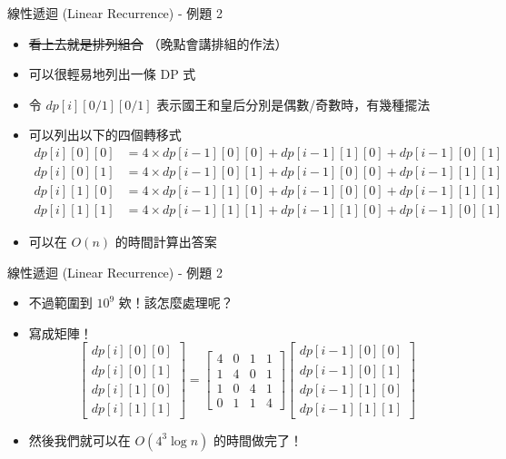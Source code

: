 \documentclass[aspectratio=169]{beamer}
\begin{document}
    \begin{frame}[fragile]{線性遞迴 (Linear Recurrence) - 例題 2}
        \begin{itemize}
            \item \sout{看上去就是排列組合} （晚點會講排組的作法）
            \item 可以很輕易地列出一條 DP 式
            \item 令 $dp[i][0/1][0/1]$ 表示國王和皇后分別是偶數/奇數時，有幾種擺法
            \item<2-> 可以列出以下的四個轉移式
            \begin{align*}
                dp[i][0][0] &= 4 \times dp[i-1][0][0] + dp[i-1][1][0] + dp[i-1][0][1] \\
                dp[i][0][1] &= 4 \times dp[i-1][0][1] + dp[i-1][0][0] + dp[i-1][1][1] \\
                dp[i][1][0] &= 4 \times dp[i-1][1][0] + dp[i-1][0][0] + dp[i-1][1][1] \\
                dp[i][1][1] &= 4 \times dp[i-1][1][1] + dp[i-1][1][0] + dp[i-1][0][1] 
            \end{align*}
            \item<2-> 可以在 $O(n)$ 的時間計算出答案
        \end{itemize}
    \end{frame}
    
    \begin{frame}[fragile]{線性遞迴 (Linear Recurrence) - 例題 2}
        \begin{itemize}
            \item 不過範圍到 $10^9$ 欸！該怎麼處理呢？
            \item 寫成矩陣！
            $$\begin{bmatrix} dp[i][0][0] \\ dp[i][0][1] \\ dp[i][1][0] \\ dp[i][1][1] \end{bmatrix} = \begin{bmatrix} 4 & 0 & 1 & 1 \\ 1 & 4 & 0 & 1 \\ 1 & 0 & 4 & 1 \\ 0 & 1 & 1 & 4 \end{bmatrix} \begin{bmatrix} dp[i-1][0][0] \\ dp[i-1][0][1] \\ dp[i-1][1][0] \\ dp[i-1][1][1] \end{bmatrix}$$
            \item 然後我們就可以在 $O(4^3 \log n)$ 的時間做完了！
        \end{itemize}
    \end{frame}
    
\end{document}
